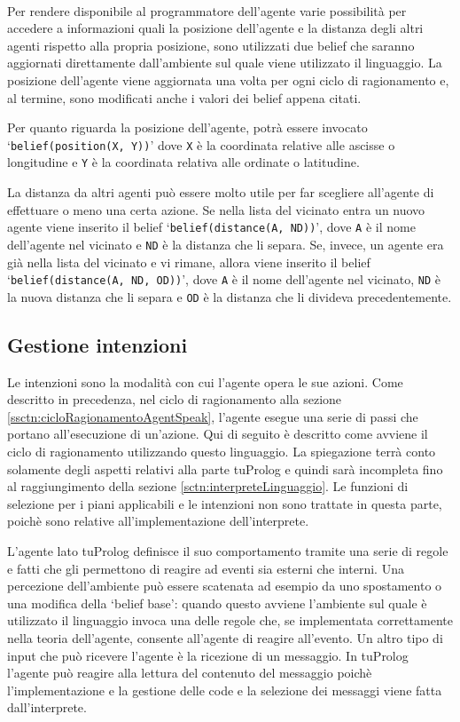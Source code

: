 \paragraph*{}
Per rendere disponibile al programmatore dell'agente varie possibilità per accedere a informazioni quali la posizione dell'agente e la distanza degli altri agenti rispetto alla propria posizione, sono utilizzati due belief che saranno aggiornati direttamente dall'ambiente sul quale viene utilizzato il linguaggio. La posizione dell'agente viene aggiornata una volta per ogni ciclo di ragionamento e, al termine, sono modificati anche i valori dei belief appena citati.

Per quanto riguarda la posizione dell'agente, potrà essere invocato `\texttt{be\-lief(po\-si\-tion(X, Y))}' dove \texttt{X} è la coordinata relative alle ascisse o longitudine e \texttt{Y} è la coordinata relativa alle ordinate o latitudine.

La distanza da altri agenti può essere molto utile per far scegliere all'agente di effettuare o meno una certa azione. Se nella lista del vicinato entra un nuovo agente viene inserito il belief `\texttt{belief(distance(A, ND))}', dove \texttt{A} è il nome dell'agente nel vicinato e \texttt{ND} è la distanza che li separa. Se, invece, un agente era già nella lista del vicinato e vi rimane, allora viene inserito il belief `\texttt{belief(distance(A, ND, OD))}', dove \texttt{A} è il nome dell'agente nel vicinato, \texttt{ND} è la nuova distanza che li separa e \texttt{OD} è la distanza che li divideva precedentemente.

\subsection{Gestione intenzioni}
Le intenzioni sono la modalità con cui l'agente opera le sue azioni. Come descritto in precedenza, nel ciclo di ragionamento alla sezione \ref{ssctn:cicloRagionamentoAgentSpeak}, l'agente esegue una serie di passi che portano all'esecuzione di un'azione.
Qui di seguito è descritto come avviene il ciclo di ragionamento utilizzando questo linguaggio. La spiegazione terrà conto solamente degli aspetti relativi alla parte tuProlog e quindi sarà incompleta fino al raggiungimento della sezione \ref{sctn:interpreteLinguaggio}. Le funzioni di selezione per i piani applicabili e le intenzioni non sono trattate in questa parte, poichè sono relative all'implementazione dell'interprete.

L'agente lato tuProlog definisce il suo comportamento tramite una serie di regole e fatti che gli permettono di reagire ad eventi sia esterni che interni. Una percezione dell'ambiente può essere scatenata ad esempio da uno spostamento o una modifica della `belief base': quando questo avviene l'ambiente sul quale è utilizzato il linguaggio invoca una delle regole che, se implementata correttamente nella teoria dell'agente, consente all'agente di reagire all'evento. Un altro tipo di input che può ricevere l'agente è la ricezione di un messaggio. In tuProlog l'agente può reagire alla lettura del contenuto del messaggio poichè l'implementazione e la gestione delle code e la selezione dei messaggi viene fatta dall'interprete.

